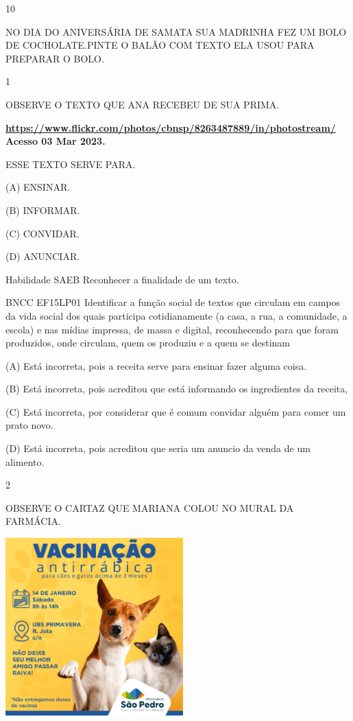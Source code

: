 {{{{\num{10}

NO DIA DO ANIVERSÁRIA DE SAMATA SUA MADRINHA FEZ UM BOLO DE
COCHOLATE.PINTE O BALÃO COM TEXTO ELA USOU PARA PREPARAR O BOLO.


\num{1}

OBSERVE O TEXTO QUE ANA RECEBEU DE SUA PRIMA.

\textbf{\url{https://www.flickr.com/photos/cbnsp/8263487889/in/photostream/}
Acesso 03 Mar 2023.}

ESSE TEXTO SERVE PARA.

(A) ENSINAR.

(B) INFORMAR.

(C) CONVIDAR.

(D) ANUNCIAR.

Habilidade SAEB Reconhecer a finalidade de um texto.

BNCC EF15LP01 Identificar a função social de textos que circulam em
campos da vida social dos quais participa cotidianamente (a casa, a rua,
a comunidade, a escola) e nas mídias impressa, de massa e digital,
reconhecendo para que foram produzidos, onde circulam, quem os produziu
e a quem se destinam

(A) Está incorreta, pois a receita serve para ensinar fazer alguma
coisa.

(B) Está incorreta, pois acreditou que está informando os ingredientes
da receita,

(C) Está incorreta, por considerar que é comum convidar alguém para
comer um prato novo.

(D) Está incorreta, pois acreditou que seria um anuncio da venda de um
alimento.

\num{2}

OBSERVE O CARTAZ QUE MARIANA COLOU NO MURAL DA FARMÁCIA.

\includegraphics[width=2.70149in,height=2.70149in]{media/image115.png}

}}}}
